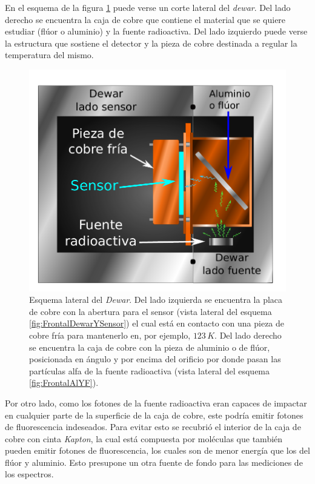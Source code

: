 En el esquema de la figura \ref{fig:LateralDewar} puede verse un corte lateral del \textit{dewar}. Del lado derecho se encuentra la caja de cobre que contiene el material que se quiere estudiar (flúor o aluminio) y la fuente radioactiva. Del lado izquierdo puede verse la estructura que sostiene el detector y la pieza de cobre destinada a regular la temperatura del mismo.
\begin{figure}%
    \centering
    \includegraphics[scale=0.7]{Figs/LateralDewar.pdf}
    \caption{\footnotesize{Esquema lateral del \textit{Dewar}. Del lado izquierda se encuentra la placa de cobre con la abertura para el sensor (vista lateral del esquema \ref{fig:FrontalDewarYSensor}) el cual está en contacto con una pieza de cobre fría para mantenerlo en, por ejemplo, $123\,\si{K}$. Del lado derecho se encuentra la caja de cobre con la pieza de aluminio o de flúor, posicionada en ángulo y por encima del orificio por donde pasan las partículas alfa de la fuente radioactiva (vista lateral del esquema \ref{fig:FrontalAlYF}).}}
    \label{fig:LateralDewar}
\end{figure}
Por otro lado, como los fotones de la fuente radioactiva eran capaces de impactar en cualquier parte de la superficie de la caja de cobre, este podría emitir fotones de fluorescencia indeseados. Para evitar esto se recubrió el interior de la caja de cobre con cinta \textit{Kapton}, la cual está compuesta por moléculas que también pueden emitir fotones de fluorescencia, los cuales son de menor energía que los del flúor y aluminio. Esto presupone un otra fuente de fondo para las mediciones de los espectros.
